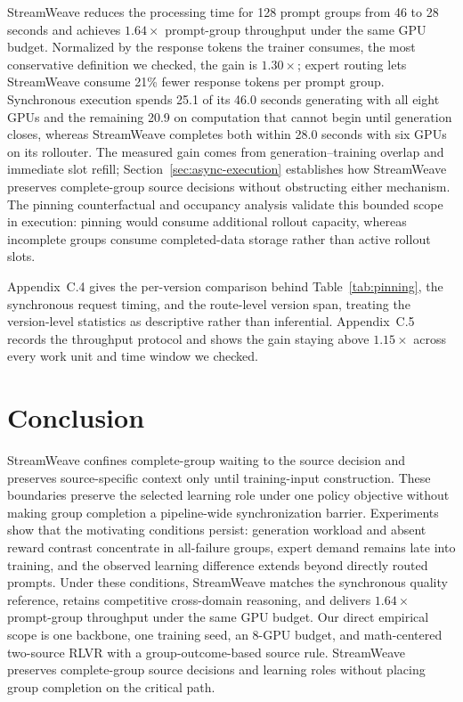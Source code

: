 \documentclass[letterpaper]{article}
\begin{document}
StreamWeave reduces the processing time for 128 prompt groups from 46 to 28 seconds and achieves $1.64\times$ prompt-group throughput under the same GPU budget.
Normalized by the response tokens the trainer consumes, the most conservative definition we checked, the gain is $1.30\times$; expert routing lets StreamWeave consume 21\% fewer response tokens per prompt group.
Synchronous execution spends 25.1 of its 46.0 seconds generating with all eight GPUs and the remaining 20.9 on computation that cannot begin until generation closes, whereas StreamWeave completes both within 28.0 seconds with six GPUs on its rollouter.
The measured gain comes from generation--training overlap and immediate slot refill; Section~\ref{sec:async-execution} establishes how StreamWeave preserves complete-group source decisions without obstructing either mechanism.
The pinning counterfactual and occupancy analysis validate this bounded scope in execution: pinning would consume additional rollout capacity, whereas incomplete groups consume completed-data storage rather than active rollout slots.

Appendix~C.4 gives the per-version comparison behind Table~\ref{tab:pinning}, the synchronous request timing, and the route-level version span, treating the version-level statistics as descriptive rather than inferential.
Appendix~C.5 records the throughput protocol and shows the gain staying above $1.15\times$ across every work unit and time window we checked.

\FloatBarrier
\section{Conclusion}
\label{sec:conclusion}

StreamWeave confines complete-group waiting to the source decision and preserves source-specific context only until training-input construction.
These boundaries preserve the selected learning role under one policy objective without making group completion a pipeline-wide synchronization barrier.
Experiments show that the motivating conditions persist: generation workload and absent reward contrast concentrate in all-failure groups, expert demand remains late into training, and the observed learning difference extends beyond directly routed prompts.
Under these conditions, StreamWeave matches the synchronous quality reference, retains competitive cross-domain reasoning, and delivers $1.64\times$ prompt-group throughput under the same GPU budget.
Our direct empirical scope is one backbone, one training seed, an 8-GPU budget, and math-centered two-source RLVR with a group-outcome-based source rule.
StreamWeave preserves complete-group source decisions and learning roles without placing group completion on the critical path.


\end{document}
